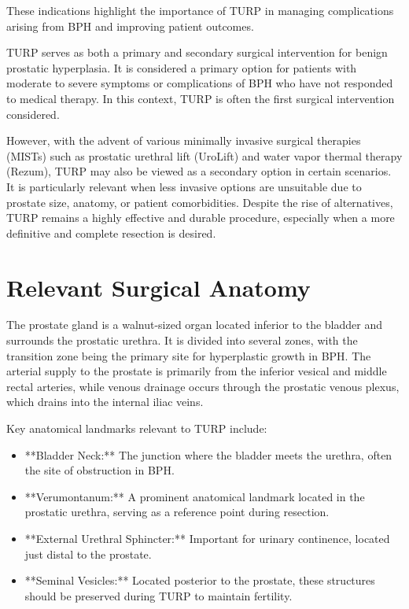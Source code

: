 These indications highlight the importance of TURP in managing complications arising from BPH and improving patient outcomes.

TURP serves as both a primary and secondary surgical intervention for benign prostatic hyperplasia. It is considered a primary option for patients with moderate to severe symptoms or complications of BPH who have not responded to medical therapy. In this context, TURP is often the first surgical intervention considered.

However, with the advent of various minimally invasive surgical therapies (MISTs) such as prostatic urethral lift (UroLift) and water vapor thermal therapy (Rezum), TURP may also be viewed as a secondary option in certain scenarios. It is particularly relevant when less invasive options are unsuitable due to prostate size, anatomy, or patient comorbidities. Despite the rise of alternatives, TURP remains a highly effective and durable procedure, especially when a more definitive and complete resection is desired.

\section*{Relevant Surgical Anatomy}
The prostate gland is a walnut-sized organ located inferior to the bladder and surrounds the prostatic urethra. It is divided into several zones, with the transition zone being the primary site for hyperplastic growth in BPH. The arterial supply to the prostate is primarily from the inferior vesical and middle rectal arteries, while venous drainage occurs through the prostatic venous plexus, which drains into the internal iliac veins. 

Key anatomical landmarks relevant to TURP include:

\begin{itemize}
  \item **Bladder Neck:** The junction where the bladder meets the urethra, often the site of obstruction in BPH.
  \item **Verumontanum:** A prominent anatomical landmark located in the prostatic urethra, serving as a reference point during resection.
  \item **External Urethral Sphincter:** Important for urinary continence, located just distal to the prostate.
  \item **Seminal Vesicles:** Located posterior to the prostate, these structures should be preserved during TURP to maintain fertility.
\end{itemize}


